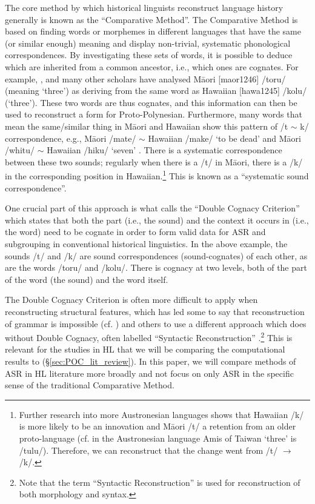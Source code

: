 \documentclass[12pt,letterpaper]{article}
\begin{document}
The core method by which historical linguists reconstruct language history generally is known as the ``Comparative Method''. The Comparative Method is based on finding words or morphemes in different languages that have the same (or similar enough) meaning and display non-trivial, systematic phonological correspondences. By investigating these sets of words, it is possible to deduce which are inherited from a common ancestor, i.e., which ones are cognates. For example, \citet{blust2004}, \citet{greenhill2011pollex} and many other scholars have analysed M\={a}ori [maor1246] /toru/ (meaning `three') as deriving from the same word as Hawaiian [hawa1245] /kolu/ (`three'). These two words are thus cognates, and this information can then be used to reconstruct a form for Proto-Polynesian. Furthermore, many words that mean the same/similar thing in M\={a}ori and Hawaiian show this pattern of /t $\sim$ k/ correspondence, e.g., M\={a}ori /mate/ $\sim$ Hawaiian /make/ `to be dead' and M\={a}ori /whitu/ $\sim$ Hawaiian /hiku/ `seven' \citep{ABVD}. There is a systematic correspondence between these two sounds; regularly when there is a /t/ in M\={a}ori, there is a /k/ in the corresponding position in Hawaiian.\footnote{Further research into more Austronesian languages shows that Hawaiian /k/ is more likely to be an innovation and M\={a}ori /t/ a retention from an older proto-language (cf. in the Austronesian language Amis of Taiwan `three' is /tulu/). Therefore, we can reconstruct that the change went from /t/ $\rightarrow$ /k/.} This is known as a ``systematic sound correspondence''. 

One crucial part of this approach is what \citet{walkden_2013} calls the ``Double Cognacy Criterion'' which states that both the part (i.e., the sound) and the context it occurs in (i.e., the word) need to be cognate in order to form valid data for ASR and subgrouping in conventional historical linguistics. In the above example, the sounds /t/ and /k/ are sound correspondences (sound-cognates) of each other, as are the words /toru/ and /kolu/. There is cognacy at two levels, both of the part of the word (the sound) and the word itself.

The Double Cognacy Criterion is often more difficult to apply when reconstructing structural features, which has led some to say that reconstruction of grammar is impossible (cf. \citealt{lightfoot_2002b}) and others to use a different approach which does without Double Cognacy, often labelled ``Syntactic Reconstruction'' \citep[17]{clark1973aspects}.\footnote{Note that the term ``Syntactic Reconstruction'' is used for reconstruction of both morphology and syntax.} This is relevant for the studies in HL that we will be comparing the computational results to (§\ref{sec:POC_lit_review}). In this paper, we will compare methods of ASR in HL literature more broadly and not focus on only ASR in the specific sense of the traditional Comparative Method.
\end{document}
